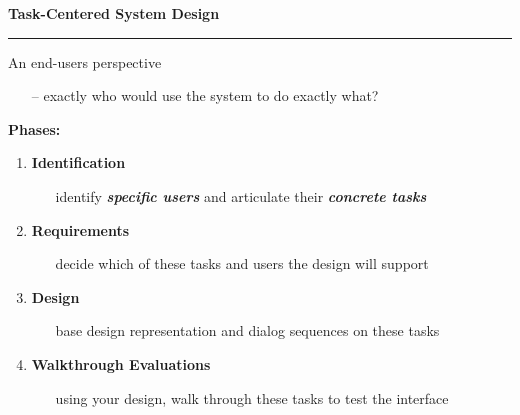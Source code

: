\documentclass[pdf]{beamer}
\begin{document}
\begin{frame}
\vspace{8mm}
\textcolor{myBlue}{\textbf{\Large{Task-Centered System Design}}}

\textcolor{red}{\rule{10cm}{1mm}}	

An end-users perspective
    \begin{itemize}
      \item [--]exactly who would use the system to do exactly what?   
    \end{itemize}  
    
 \textbf{Phases:}
 \begin{enumerate}
 \item \textbf{Identification}
 	\begin{itemize}
      \item []identify \textbf{\textit{specific users}} and articulate their \textbf{\textit{concrete tasks}}
    \end{itemize} 
 \item \textbf{Requirements}
 	\begin{itemize}
      \item []decide which of these tasks and users the design will support
    \end{itemize} 
 \item \textbf{Design}
 	\begin{itemize}
      \item []base design representation and dialog sequences on these tasks  
    \end{itemize} 
 \item \textbf{Walkthrough Evaluations}
 	\begin{itemize}
      \item []using your design, walk through these tasks to test the interface
    \end{itemize} 
 \end{enumerate}
\end{frame}
\end{document}
